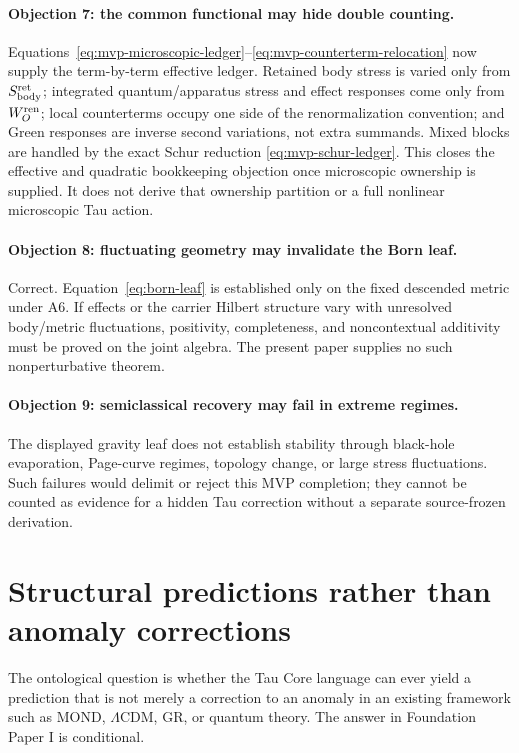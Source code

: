 \documentclass[11pt]{article}
\begin{document}
\paragraph{Objection 7: the common functional may hide double counting.}
Equations~\eqref{eq:mvp-microscopic-ledger}--\eqref{eq:mvp-counterterm-relocation}
now supply the term-by-term effective ledger.  Retained body stress is varied
only from \(S_{\rm body}^{\rm ret}\); integrated quantum/apparatus stress and
effect responses come only from \(W_O^{\rm ren}\); local counterterms occupy
one side of the renormalization convention; and Green responses are inverse
second variations, not extra summands.  Mixed blocks are handled by the exact
Schur reduction \eqref{eq:mvp-schur-ledger}.  This closes the effective and
quadratic bookkeeping objection once microscopic ownership is supplied.  It
does not derive that ownership partition or a full nonlinear microscopic Tau
action.

\paragraph{Objection 8: fluctuating geometry may invalidate the Born leaf.}
Correct.  Equation~\eqref{eq:born-leaf} is established only on the fixed
descended metric under A6.  If effects or the carrier Hilbert structure vary
with unresolved body/metric fluctuations, positivity, completeness, and
noncontextual additivity must be proved on the joint algebra.  The present
paper supplies no such nonperturbative theorem.

\paragraph{Objection 9: semiclassical recovery may fail in extreme regimes.}
The displayed gravity leaf does not establish stability through black-hole
evaporation, Page-curve regimes, topology change, or large stress
fluctuations.  Such failures would delimit or reject this MVP completion; they
cannot be counted as evidence for a hidden Tau correction without a separate
source-frozen derivation.

\section{Structural predictions rather than anomaly corrections}

The ontological question is whether the Tau Core language can ever yield a
prediction that is not merely a correction to an anomaly in an existing
framework such as MOND, \(\Lambda\)CDM, GR, or quantum theory.  The answer in
Foundation Paper I is conditional.
\end{document}
